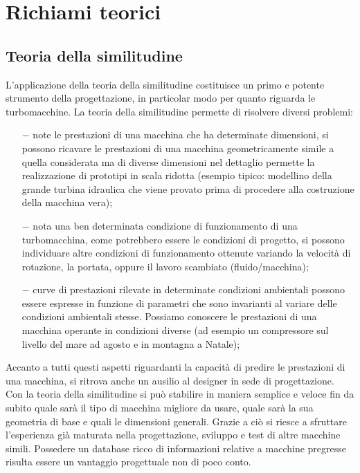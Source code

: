 \chapter{Richiami teorici}
\section{Teoria della similitudine}
L’applicazione della teoria della similitudine costituisce un primo e potente strumento della progettazione, in particolar modo per quanto riguarda le turbomacchine. La teoria della similitudine permette di risolvere diversi problemi:
\begin{itemize}
\item[$-$] note le prestazioni di una macchina che ha determinate dimensioni,
si possono ricavare le prestazioni di una macchina geometricamente simile a quella considerata ma di diverse dimensioni nel dettaglio permette la realizzazione di prototipi in scala ridotta (esempio tipico: modellino della grande turbina idraulica che viene provato prima di procedere alla costruzione della macchina vera);
\item[$-$] nota una ben determinata condizione di funzionamento di una turbomacchina, come potrebbero essere le condizioni di progetto, si possono individuare altre condizioni di funzionamento ottenute variando la velocità di rotazione, la portata, oppure il lavoro scambiato (fluido/macchina);
\item[$-$] curve di prestazioni rilevate in determinate condizioni ambientali possono essere espresse in funzione di parametri che sono invarianti al variare delle condizioni ambientali stesse. Possiamo conoscere le prestazioni di una macchina operante in condizioni diverse (ad esempio un compressore sul livello del mare ad agosto e in montagna a Natale);
\end{itemize}
Accanto a tutti questi aspetti riguardanti la capacità di predire le prestazioni di una macchina, si ritrova anche un ausilio al designer in sede di progettazione. Con la teoria della similitudine si può stabilire in maniera semplice e veloce fin da subito quale sarà il tipo di macchina migliore da usare, quale sarà la sua geometria di base e quali le dimensioni generali. Grazie a ciò si riesce a sfruttare l’esperienza già maturata nella progettazione, sviluppo e test di altre macchine simili. Possedere un database ricco di informazioni relative a macchine pregresse risulta essere un vantaggio progettuale non di poco conto.


